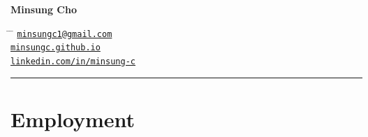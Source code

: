 \documentclass[11pt]{article} %
\begin{document}

\parbox{0.5\textwidth}{ %
\huge{\textbf{Minsung Cho}}
}
\hfill %
\parbox{0.5\textwidth}{ %
\begin{tabbing} %
\hspace{3cm} \= \hspace{4cm} \= \kill %
\href{mailto:minsungc1@gmail.com}{\texttt{minsungc1@gmail.com}} \\
\href{https://minsungc.github.io}{\texttt{minsungc.github.io}} \\
\href{https://linkedin.com/in/minsung-c}{\texttt{linkedin.com/in/minsung-c}}
\end{tabbing}}

\vspace{2pt}

\vspace{3pt}
\hrule


\newcommand{\job}[7]{%
{\setlength{\parskip}{0.2pt}%
\par\noindent\textbf{\textit{#6}}\hfill\textbf{#1 #2}\par
\noindent\href{#5}{#3}\hfill\textit{#4}\par}
\nopagebreak
\vspace{-3pt}
\begin{itemize}\setlength{\itemsep}{0.2pt}\setlength{\parskip}{0pt}\setlength{\topsep}{0pt}\setlength{\parsep}{0pt}
    #7
\end{itemize}
\vspace{0.5em}
}

\section{Employment}
\end{document}
